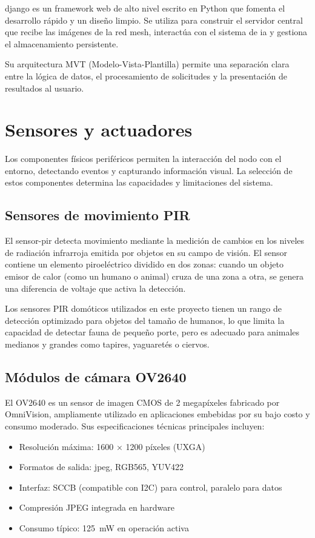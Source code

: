 \documentclass[a4paper, 12pt]{report}
\begin{document}
\gls{django} es un framework web de alto nivel escrito en Python que fomenta
el desarrollo rápido y un diseño limpio. Se utiliza para construir el servidor
central que recibe las imágenes de la red \gls{mesh}, interactúa con el sistema
de \gls{ia} y gestiona el almacenamiento persistente.

Su arquitectura MVT (Modelo-Vista-Plantilla) permite una separación clara entre
la lógica de datos, el procesamiento de solicitudes y la presentación de
resultados al usuario.

\section{Sensores y actuadores}

Los componentes físicos periféricos permiten la interacción del nodo con el
entorno, detectando eventos y capturando información visual. La selección de
estos componentes determina las capacidades y limitaciones del sistema.

\subsection{Sensores de movimiento PIR}

El \gls{sensor-pir} detecta movimiento mediante la medición de cambios en los
niveles de radiación infrarroja emitida por objetos en su campo de visión. El
sensor contiene un elemento piroeléctrico dividido en dos zonas: cuando un objeto
emisor de calor (como un humano o animal) cruza de una zona a otra, se genera
una diferencia de voltaje que activa la detección.

Los sensores PIR domóticos utilizados en este proyecto tienen un rango de
detección optimizado para objetos del tamaño de humanos, lo que limita la
capacidad de detectar fauna de pequeño porte, pero es adecuado para animales
medianos y grandes como tapires, yaguaretés o ciervos.

\subsection{Módulos de cámara OV2640}

El OV2640 es un sensor de imagen CMOS de \num{2} megapíxeles fabricado por OmniVision,
ampliamente utilizado en aplicaciones embebidas por su bajo costo y consumo
moderado. Sus especificaciones técnicas principales incluyen:

\begin{itemize}
  \item Resolución máxima: \num{1600} × \num{1200} píxeles (UXGA)
  \item Formatos de salida: \gls{jpeg}, RGB565, YUV422
  \item Interfaz: SCCB (compatible con I2C) para control, paralelo para datos
  \item Compresión JPEG integrada en hardware
  \item Consumo típico: \qty{125}{mW} en operación activa
\end{itemize}
\end{document}
